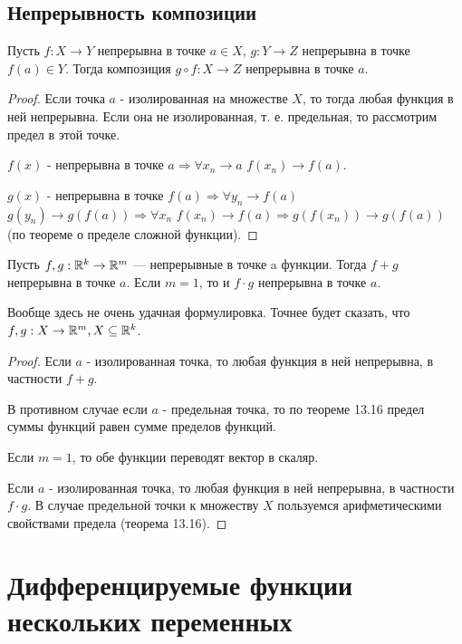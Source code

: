     \section{Непрерывность композиции}
    
    \begin{sentence}
    	Пусть $f : X \rightarrow Y$ непрерывна в точке $a \in X$, $g : Y \rightarrow Z$ непрерывна в точке $f(a) \in Y$. Тогда композиция $g \circ f : X \rightarrow Z$ непрерывна в точке $a$.
    \end{sentence}
    
    \begin{proof}
    	Если точка $a$ - изолированная на множестве $X$, то тогда любая функция в ней непрерывна. Если она не изолированная, т. е. предельная, то рассмотрим предел в этой точке.
    	
    	$f(x)$ - непрерывна в точке $a \Rightarrow \forall x_n \to a$ $f(x_n) \to f(a)$.
    	
    	$g(x)$ - непрерывна в точке $f(a) \Rightarrow \forall y_n \to f(a)$ $g(y_n) \to g(f(a)) \Rightarrow \forall x_n$ $f(x_n) \to f(a) \Rightarrow g(f(x_n)) \to g(f(a))$ (по теореме о пределе сложной функции).
    \end{proof}
    
    \begin{sentence}
    Пусть $f, g : \mathbb R^k \rightarrow \mathbb R^m$ — непрерывные в точке a функции. Тогда $f + g$ непрерывна в точке $a$. Если $m = 1$, то и $f \cdot g$ непрерывна в точке $a$.
    \end{sentence}
    
    Вообще здесь не очень удачная формулировка. Точнее будет сказать, что $f, g : X \rightarrow \mathbb R^m, X \subseteq \mathbb R^k$.
    
    \begin{proof}
    	Если $a$ - изолированная точка, то любая функция в ней непрерывна, в частности $f + g$.
    	
    	В противном случае если $a$ - предельная точка, то по теореме 13.16 предел суммы функций равен сумме пределов функций.
    	
    	Если $m = 1$, то обе функции переводят вектор в скаляр.
    	
    	Если $a$ - изолированная точка, то любая функция в ней непрерывна, в частности $f \cdot g$. В случае предельной точки к множеству $X$ пользуемся арифметическими свойствами предела (теорема 13.16).
    \end{proof}
    
    \chapter{Дифференцируемые функции нескольких переменных}
    
